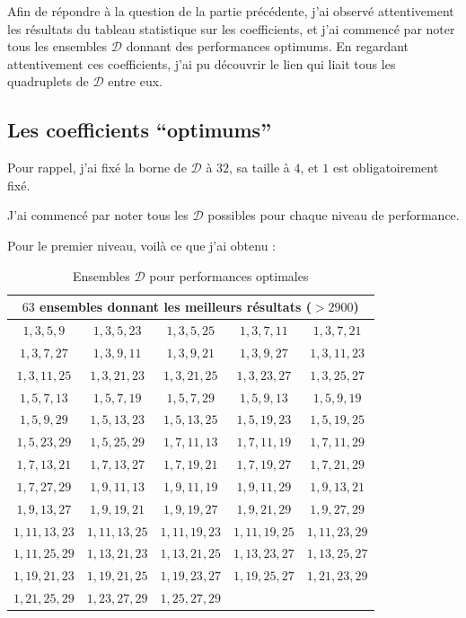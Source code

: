 \documentclass[12pt, a4paper]{memoir}
\begin{document}
  Afin de répondre à la question de la partie précédente, j'ai observé attentivement les résultats du tableau
  statistique sur les coefficients, et j'ai commencé par noter tous les ensembles $\mathcal{D}$ donnant des 
  performances optimums.
  En regardant attentivement ces coefficients, j'ai pu découvrir le lien qui liait tous les quadruplets de
  $\mathcal{D}$ entre eux.
  
  \subsection{Les coefficients ``optimums''}
  
  Pour rappel, j'ai fixé la borne de $\mathcal{D}$ à $32$, sa taille à $4$, et $1$ est obligatoirement fixé.

  J'ai commencé par noter tous les $\mathcal{D}$ possibles pour chaque niveau de performance.
  
  Pour le premier niveau, voilà ce que j'ai obtenu :
  
\begin{table}[htbp]
\caption{Ensembles $\mathcal{D}$ pour performances optimales }
\begin{center}
\begin{tabular}{ccccc}
\toprule
\multicolumn{5}{c}{$63$ ensembles donnant les meilleurs résultats ($> 2900$)} \\
\midrule
$1,3,5,9$ & $1,3,5,23$ & $1,3,5,25$ & $1,3,7,11$ & $1,3,7,21$ \\
$1,3,7,27$ & $1,3,9,11$ & $1,3,9,21$ & $1,3,9,27$ & $1,3,11,23$ \\
$1,3,11,25$ & $1,3,21,23$ & $1,3,21,25$ & $1,3,23,27$ & $1,3,25,27$ \\
$1,5,7,13$ & $1,5,7,19$ & $1,5,7,29$ & $1,5,9,13$ & $1,5,9,19$ \\
$1,5,9,29$ & $1,5,13,23$ & $1,5,13,25$ & $1,5,19,23$ & $1,5,19,25$ \\
$1,5,23,29$ & $1,5,25,29$ & $1,7,11,13$ & $1,7,11,19$ & $1,7,11,29$ \\
$1,7,13,21$ & $1,7,13,27$ & $1,7,19,21$ & $1,7,19,27$ & $1,7,21,29$ \\ %
$1,7,27,29$ & $1,9,11,13$ & $1,9,11,19$ & $1,9,11,29$ & $1,9,13,21$ \\
$1,9,13,27$ & $1,9,19,21$ & $1,9,19,27$ & $1,9,21,29$ & $1,9,27,29$ \\
$1,11,13,23$ & $1,11,13,25$ & $1,11,19,23$ & $1,11,19,25$ & $1,11,23,29$ \\
$1,11,25,29$ & $1,13,21,23$ & $1,13,21,25$ & $1,13,23,27$ & $1,13,25,27$ \\
$1,19,21,23$ & $1,19,21,25$ & $1,19,23,27$ & $1,19,25,27$ & $1,21,23,29$ \\
$1,21,25,29$ & $1,23,27,29$ & $1,25,27,29$ & \, & \, \\
\bottomrule
\end{tabular}
\end{center}
\label{tab:example}
\end{table}%
  
\end{document}
